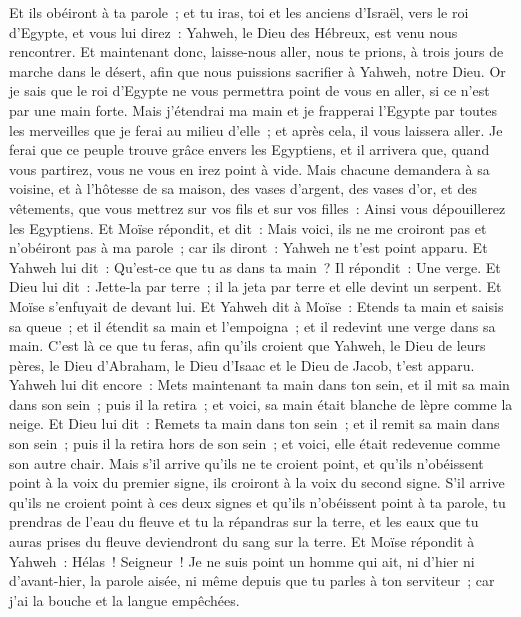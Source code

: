 \begin{multicols}{2}
Et ils obéiront à ta parole~; et tu iras, toi et les anciens d'Israël, vers le roi d'Egypte, et vous lui direz~: Yahweh, le Dieu des Hébreux, est venu nous rencontrer. Et maintenant donc, laisse-nous aller, nous te prions, à trois jours de marche dans le désert, afin que nous puissions sacrifier à Yahweh, notre Dieu.
Or je sais que le roi d'Egypte ne vous permettra point de vous en aller, si ce n'est par une main forte.
Mais j'étendrai ma main et je frapperai l'Egypte par toutes les merveilles que je ferai au milieu d'elle~; et après cela, il vous laissera aller.
Je ferai que ce peuple trouve grâce envers les Egyptiens, et il arrivera que, quand vous partirez, vous ne vous en irez point à vide.
Mais chacune demandera à sa voisine, et à l'hôtesse de sa maison, des vases d'argent, des vases d'or, et des vêtements, que vous mettrez sur vos fils et sur vos filles~: Ainsi vous dépouillerez les Egyptiens.
\VerseOne{}Et Moïse répondit, et dit~: Mais voici, ils ne me croiront pas et n'obéiront pas à ma parole~; car ils diront~: Yahweh ne t'est point apparu.
Et Yahweh lui dit~: Qu'est-ce que tu as dans ta main~? Il répondit~: Une verge.
Et Dieu lui dit~: Jette-la par terre~; il la jeta par terre et elle devint un serpent. Et Moïse s'enfuyait de devant lui.
Et Yahweh dit à Moïse~: Etends ta main et saisis sa queue~; et il étendit sa main et l'empoigna~; et il redevint une verge dans sa main.
C'est là ce que tu feras, afin qu'ils croient que Yahweh, le Dieu de leurs pères, le Dieu d'Abraham, le Dieu d'Isaac et le Dieu de Jacob, t'est apparu.
Yahweh lui dit encore~: Mets maintenant ta main dans ton sein, et il mit sa main dans son sein~; puis il la retira~; et voici, sa main était blanche de lèpre comme la neige.
Et Dieu lui dit~: Remets ta main dans ton sein~; et il remit sa main dans son sein~; puis il la retira hors de son sein~; et voici, elle était redevenue comme son autre chair.
Mais s'il arrive qu'ils ne te croient point, et qu'ils n'obéissent point à la voix du premier signe, ils croiront à la voix du second signe.
S'il arrive qu'ils ne croient point à ces deux signes et qu'ils n'obéissent point à ta parole, tu prendras de l'eau du fleuve et tu la répandras sur la terre, et les eaux que tu auras prises du fleuve deviendront du sang sur la terre.
Et Moïse répondit à Yahweh~: Hélas~! Seigneur~! Je ne suis point un homme qui ait, ni d'hier ni d'avant-hier, la parole aisée, ni même depuis que tu parles à ton serviteur~; car j'ai la bouche et la langue empêchées.

\end{multicols}
